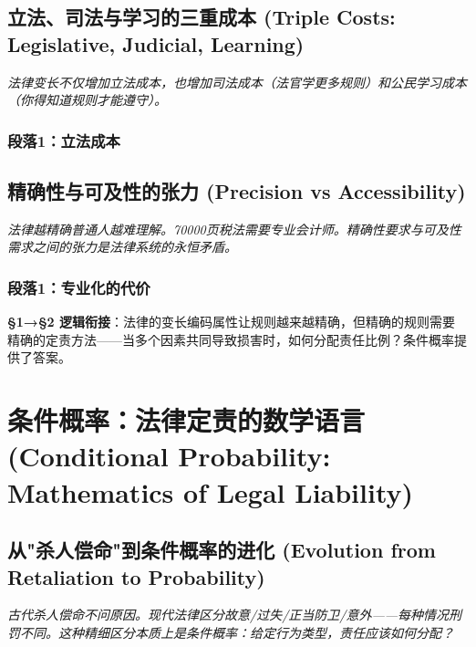 \documentclass[a4paper,12pt]{book}
\newenvironment{motivation}{\begin{tcolorbox}[colback=gray!10,colframe=gray!60,title=\textit{动机}]\small\itshape}{\end{tcolorbox}}
\begin{document}
\begin{motivation}
\begin{motivation}
\begin{motivation}
	\subsection{立法、司法与学习的三重成本 (Triple Costs: Legislative, Judicial, Learning)}
	\begin{motivation}
		法律变长不仅增加立法成本，也增加司法成本（法官学更多规则）和公民学习成本（你得知道规则才能遵守）。\end{motivation}
	\subsubsection*{段落1：立法成本}

	\subsection{精确性与可及性的张力 (Precision vs Accessibility)}
	\begin{motivation}法律越精确普通人越难理解。70000页税法需要专业会计师。精确性要求与可及性需求之间的张力是法律系统的永恒矛盾。\end{motivation}
	\subsubsection*{段落1：专业化的代价}

	\textbf{§1→§2 逻辑衔接}：法律的变长编码属性让规则越来越精确，但精确的规则需要精确的定责方法——当多个因素共同导致损害时，如何分配责任比例？条件概率提供了答案。

	\section{条件概率：法律定责的数学语言 (Conditional Probability: Mathematics of Legal Liability)}

	\subsection{从"杀人偿命"到条件概率的进化 (Evolution from Retaliation to Probability)}
	\begin{motivation}
		古代杀人偿命不问原因。现代法律区分故意/过失/正当防卫/意外——每种情况刑罚不同。这种精细区分本质上是条件概率：给定行为类型，责任应该如何分配？
	\end{motivation}


\end{motivation}
\end{motivation}
\end{motivation}
\end{document}
